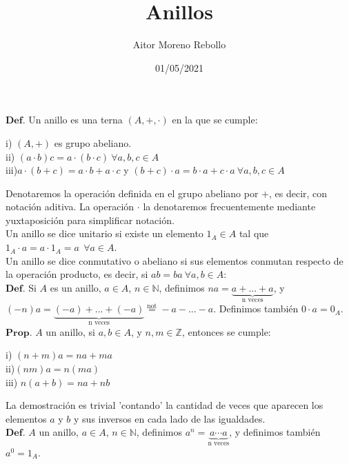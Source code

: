 \documentclass{article}
\title{Anillos}
\author{Aitor Moreno Rebollo}
\date{01/05/2021}
\begin{document}
\setlength{\parindent}{0cm}
\maketitle

$\textbf{Def.}$ Un anillo es una terna $(A, +, \cdot)$ en la que se cumple:
\begin{adjustwidth}{0.5cm}{}
    i) $(A, +)$ es grupo abeliano.\\
    ii) $(a\cdot b)c = a\cdot (b \cdot c) \ \forall a, b, c \in A$\\
    iii)$a\cdot (b + c) = a\cdot b + a \cdot c$ y $(b + c) \cdot a = b\cdot a + c \cdot a \ \forall a,b,c \in A$
\end{adjustwidth}
Denotaremos la operación definida en el grupo abeliano por $+$, es decir, con notación aditiva. La operación $\cdot$ la denotaremos frecuentemente mediante yuxtaposición para simplificar notación.\\

Un anillo se dice unitario si existe un elemento $1_A \in A$ tal que $1_A \cdot a = a\cdot 1_A = a \ \  \forall a \in A$.\\
Un anillo se dice conmutativo o abeliano si sus elementos conmutan respecto de la operación producto, es decir, si $ab = ba \ \forall a,b \in A$:\\

$\textbf{Def.}$ Si $A$ es un anillo, $a\in A$, $n \in \mathbb{N}$, definimos $na = \underbrace{a + ... + a}_{\text{n veces}}$, y $(-n)a = \underbrace{(-a) + ... + (-a)}_{\text{n veces}} \overset{\text{not}}{=} - a - ... - a$. Definimos también $0\cdot a = 0_A$.\\

$\textbf{Prop.}$ $A$ un anillo, si $a,b\in A$, y $n,m \in \mathbb{Z}$, entonces se cumple:
\begin{adjustwidth}{0.5cm}{}
    i) $(n + m)a = na + ma$\\
    ii)$(nm)a = n(ma)$\\
    iii) $n(a + b) = na + nb$
\end{adjustwidth}
La demostración es trivial 'contando'  la cantidad de veces que aparecen los elementos $a$ y $b$ y sus inversos en cada lado de las igualdades.\\

$\textbf{Def.}$ $A$ un anillo, $a \in A$, $n \in \mathbb{N}$, definimos $a^n = \underbrace{a \cdots a}_{\text{n veces}}$, y definimos también $a^{0} = 1_A$.\\
\end{document}
